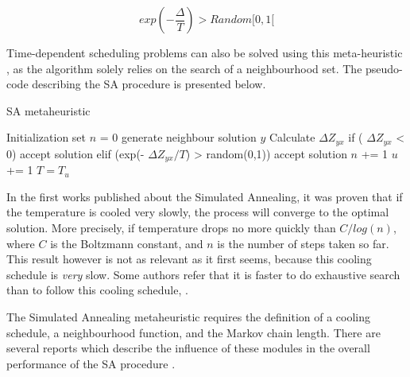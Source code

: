 \begin{equation}
\label{eq:metropolis}
  exp(-\frac{\Delta}{T}) > Random[0, 1[
\end{equation}

Time-dependent scheduling problems can also be solved using this meta-heuristic \cite{simulated_annealing_2}, as the algorithm solely relies on the search of a neighbourhood set. The pseudo-code describing the SA procedure  is presented below.

\makeatletter
\def\BState{\State\hskip-\ALG@thistlm}
\makeatother

\begin{algorithm}
\caption{SA metaheuristic}\label{eq:sa_metacode}
  \begin{algorithmic}[1]
    \State Initialization 
    \State set $n$ = 0
      generate neighbour solution $y$
    \State  Calculate $\Delta Z_{yx}$
    \State if ( $\Delta Z_{yx}$ < 0) accept solution 
    \State  elif (exp(- $\Delta Z_{yx}/T$) > random(0,1)) accept solution
    \State  $n$ += 1
    \EndWhile
    \State  $u$ += 1
    \State $  T = T_{u}$
    \EndWhile
    \EndProcedure
  \end{algorithmic}
\end{algorithm}


In the first works published about the Simulated Annealing, it was proven that if the temperature is cooled very slowly, the process will converge to the optimal solution. More precisely,  if temperature drops no more quickly than $C/log(n)$, where $C$ is the Boltzmann constant, and $n$ is the number of steps taken so far. This result however is not as relevant as it first seems, because this cooling schedule is \textit{very} slow. Some authors refer that it is faster to do exhaustive search than to follow this cooling schedule, \cite{local_search_book}.

The Simulated Annealing metaheuristic requires the definition of a cooling schedule, a neighbourhood function, and the Markov chain length. There are several reports which describe the influence of these modules in the overall performance of the SA procedure \cite{sa_cooling_influence}. 




